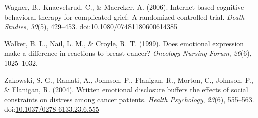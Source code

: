 \documentclass[english,man]{apa6}
\theoremstyle{definition}
\theoremstyle{definition}
\theoremstyle{definition}
\theoremstyle{remark}
\begin{document}
\hypertarget{ref-Wagner2006}{}
Wagner, B., Knaevelsrud, C., \& Maercker, A. (2006). Internet-based
cognitive-behavioral therapy for complicated grief: A randomized
controlled trial. \emph{Death Studies}, \emph{30}(5), 429--453.
doi:\href{https://doi.org/10.1080/07481180600614385}{10.1080/07481180600614385}

\hypertarget{ref-Walker1999a}{}
Walker, B. L., Nail, L. M., \& Croyle, R. T. (1999). Does emotional
expression make a difference in reactions to breast cancer?
\emph{Oncology Nursing Forum}, \emph{26}(6), 1025--1032.

\hypertarget{ref-Zakowski2004}{}
Zakowski, S. G., Ramati, A., Johnson, P., Flanigan, R., Morton, C.,
Johnson, P., \& Flanigan, R. (2004). Written emotional disclosure
buffers the effects of social constraints on distress among cancer
patients. \emph{Health Psychology}, \emph{23}(6), 555--563.
doi:\href{https://doi.org/10.1037/0278-6133.23.6.555}{10.1037/0278-6133.23.6.555}
\end{document}
